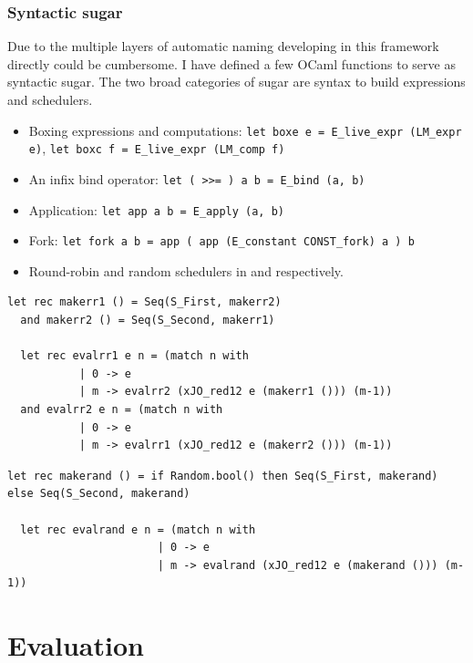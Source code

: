 \documentclass[12pt,twoside,notitlepage]{report}
\begin{document}
\subsection{Syntactic sugar}
Due to the multiple layers of automatic naming developing in this framework directly could be cumbersome. I have defined a few OCaml functions to serve as syntactic sugar. The two broad categories of sugar are syntax to build expressions and schedulers. 
\begin{itemize}
\item{Boxing expressions and computations: \lstinline|let boxe e = E_live_expr (LM_expr e)|, \lstinline|let boxc f = E_live_expr (LM_comp f)|}
\item{An infix bind operator: \lstinline|let ( >>= ) a b = E_bind (a, b)|}
\item{Application: \lstinline|let app a b = E_apply (a, b)|}
\item{Fork: \lstinline|let fork a b = app ( app (E_constant CONST_fork) a ) b|}
\item{Round-robin and random schedulers in  and  respectively.}
\end{itemize}
\begin{minipage}{\linewidth}
\begin{lstlisting}[caption={OCaml round-robin scheduler}, label={lst:ocamlrrsched}]
  let rec makerr1 () = Seq(S_First, makerr2) 
  and makerr2 () = Seq(S_Second, makerr1) 
  
  let rec evalrr1 e n = (match n with 
           | 0 -> e
           | m -> evalrr2 (xJO_red12 e (makerr1 ())) (m-1))
  and evalrr2 e n = (match n with 
           | 0 -> e
           | m -> evalrr1 (xJO_red12 e (makerr2 ())) (m-1))
\end{lstlisting}
\end{minipage}
\begin{minipage}{\linewidth}
\begin{lstlisting}[caption={OCaml random scheduler}, label={lst:ocamlrandsched}]
  let rec makerand () = if Random.bool() then Seq(S_First, makerand) else Seq(S_Second, makerand)
  
  let rec evalrand e n = (match n with 
                       | 0 -> e
                       | m -> evalrand (xJO_red12 e (makerand ())) (m-1))
\end{lstlisting}
\end{minipage}


\cleardoublepage
\chapter{Evaluation}
\end{document}
